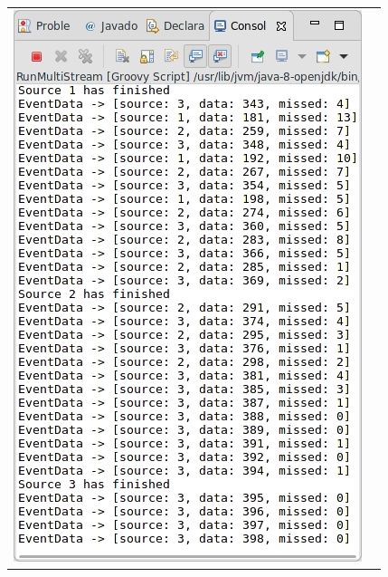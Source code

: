 \begin{tabular}{c|c}
	\includegraphics[width=\textwidth/2]{img/screenshots/9-3-1-2.png} \\

\end{tabular}

